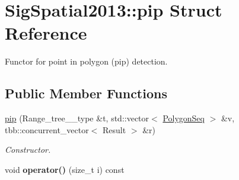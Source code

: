 \hypertarget{structSigSpatial2013_1_1pip}{\section{Sig\-Spatial2013\-:\-:pip Struct Reference}
\label{structSigSpatial2013_1_1pip}
}


Functor for point in polygon (pip) detection.  


\subsection*{Public Member Functions}
\begin{DoxyCompactItemize}
\item 
\hyperlink{structSigSpatial2013_1_1pip_a2617c5b63b0f13a36ed7bc322965f08c}{pip} (Range\-\_\-tree\-\_\-\_\-type \&t, std\-::vector$<$ \hyperlink{structSigSpatial2013_1_1PolygonSeq}{Polygon\-Seq} $>$ \&v, tbb\-::concurrent\-\_\-vector$<$ Result $>$ \&r)
\begin{DoxyCompactList}\small\item\em Constructor. \end{DoxyCompactList}\item 
\hypertarget{structSigSpatial2013_1_1pip_a7311b3164f231c9e5bac2f125eddbf41}{void {\bfseries operator()} (size\-\_\-t i) const }\label{structSigSpatial2013_1_1pip_a7311b3164f231c9e5bac2f125eddbf41}

\end{DoxyCompactItemize}
